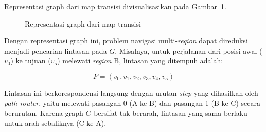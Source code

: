 Representasi graph dari map transisi divisualisasikan pada
Gambar~\ref{fig:topologi_graph}.

\begin{figure}[H]
\centering

\caption{Representasi graph dari map transisi}
\label{fig:topologi_graph}
\end{figure}

Dengan representasi graph ini, problem navigasi multi-\emph{region} dapat
direduksi menjadi pencarian lintasan pada $G$. Misalnya, untuk perjalanan
dari posisi awal ($v_0$) ke tujuan ($v_5$) melewati \emph{region} B,
lintasan yang ditempuh adalah:

\begin{equation}
P = (v_0, v_1, v_2, v_3, v_4, v_5)
\end{equation}

Lintasan ini berkorespondensi langsung dengan urutan \emph{step} yang
dihasilkan oleh \emph{path router}, yaitu melewati pasangan 0 (A ke B) dan
pasangan 1 (B ke C) secara berurutan. Karena graph $G$ bersifat tak-berarah,
lintasan yang sama berlaku untuk arah sebaliknya (C ke A).